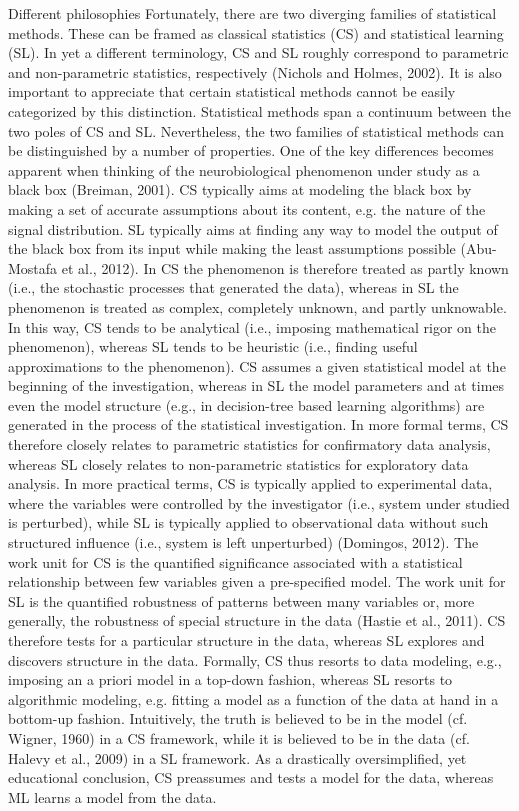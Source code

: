 \documentclass[authoryear,review,3p]{elsarticle}
\begin{document}
Different philosophies
Fortunately, there are two diverging families of statistical methods. These can be framed as classical statistics (CS) and statistical learning (SL).  In yet a different terminology, CS and SL roughly correspond to parametric and non-parametric statistics, respectively (Nichols and Holmes, 2002). It is also important to appreciate that certain statistical methods cannot be easily categorized by this distinction. Statistical methods span a continuum between the two poles of CS and SL. Nevertheless, the two families of statistical methods can be distinguished by a number of properties.
One of the key differences becomes apparent when thinking of the neurobiological phenomenon under study as a black box (Breiman, 2001). CS typically aims at modeling the black box by making a set of accurate assumptions about its content, e.g. the nature of the signal distribution. SL typically aims at finding any way to model the output of the black box from its input while making the least assumptions possible (Abu-Mostafa et al., 2012). In CS the phenomenon is therefore treated as partly known (i.e., the stochastic processes that generated the data), whereas in SL the phenomenon is treated as complex, completely unknown, and partly unknowable. In this way, CS tends to be analytical (i.e., imposing mathematical rigor on the phenomenon), whereas SL tends to be heuristic (i.e., finding useful approximations to the phenomenon). CS assumes a given statistical model at the beginning of the investigation, whereas in SL the model parameters and at times even the model structure (e.g., in decision-tree based learning algorithms) are generated in the process of the statistical investigation. In more formal terms, CS therefore closely relates to parametric statistics for confirmatory data analysis, whereas SL closely relates to non-parametric statistics for exploratory data analysis. In more practical terms, CS is typically applied to experimental data, where the variables were controlled by the investigator (i.e., system under studied is perturbed), while SL is typically applied to observational data without such structured influence (i.e., system is left unperturbed) (Domingos, 2012). The work unit for CS is the quantified significance associated with a statistical relationship between few variables given a pre-specified model. The work unit for SL is the quantified robustness of patterns between many variables or, more generally, the robustness of special structure in the data (Hastie et al., 2011). CS therefore tests for a particular structure in the data, whereas SL explores and discovers structure in the data. Formally, CS thus resorts to data modeling, e.g., imposing an a priori model in a top-down fashion, whereas SL resorts to algorithmic modeling, e.g. fitting a model as a function of the data at hand in a bottom-up fashion. Intuitively, the truth is believed to be in the model (cf. Wigner, 1960) in a CS framework, while it is believed to be in the data (cf. Halevy et al., 2009) in a SL framework. As a drastically oversimplified, yet educational conclusion, CS preassumes and tests a model for the data, whereas ML learns a model from the data.
\end{document}
